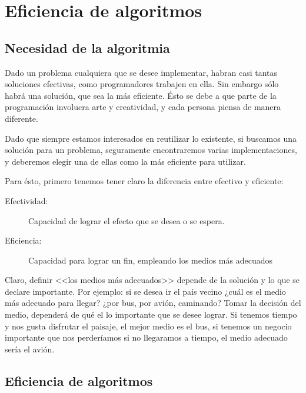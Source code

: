 \section{Eficiencia de algoritmos}

\subsection{Necesidad de la algoritmia}
\label{sec:necesidad-de-la}

Dado un problema cualquiera que se desee implementar, habran casi
tantas soluciones efectivas, como programadores trabajen en ella.  Sin
embargo sólo habrá una solución, que sea la más eficiente. Ésto se
debe a que parte de la programación involucra arte y creatividad, y
cada persona piensa de manera diferente.

Dado que siempre estamos interesados en reutilizar lo existente, si
buscamos una solución para un problema, seguramente encontraremos
varias implementaciones, y deberemos elegir una de ellas como la más
eficiente para utilizar.

Para ésto, primero tenemos tener claro la diferencia entre efectivo y
eficiente:

\begin{description}
\item[Efectividad: ] Capacidad de lograr el efecto que se desea o se
  espera.
\item[Eficiencia: ] Capacidad para lograr un fin, empleando los medios
  más adecuados
\end{description}

Claro, definir <<los medios más adecuados>> depende de la solución y lo
que se declare importante.  Por ejemplo: si se desea ir el país vecino
¿cuál es el medio más adecuado para llegar? ¿por bus, por avión,
caminando? Tomar la decisión del medio, dependerá de qué el lo
importante que se desee lograr. Si tenemos tiempo y nos gusta
disfrutar el paisaje, el mejor medio es el bus, si tenemos un negocio
importante que nos perderíamos si no llegaramos a tiempo, el medio
adecuado sería el avión.

\subsection{Eficiencia de algoritmos}
\label{sec:efic-de-algor}


